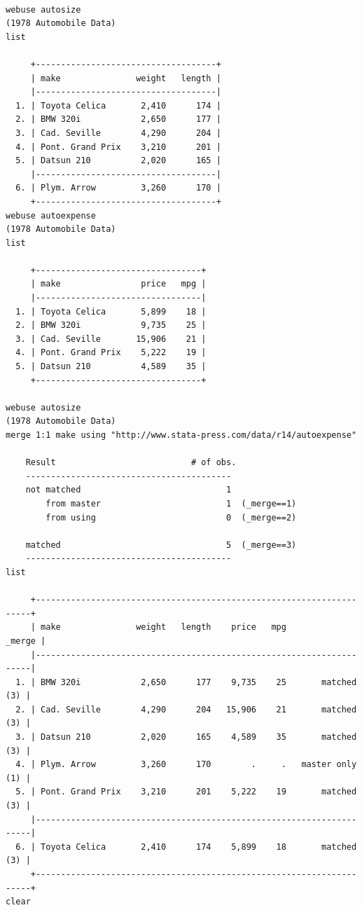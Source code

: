 \documentclass[
]{book}
\begin{document}
\begin{verbatim}

webuse autosize 
(1978 Automobile Data)
list

     +------------------------------------+
     | make               weight   length |
     |------------------------------------|
  1. | Toyota Celica       2,410      174 |
  2. | BMW 320i            2,650      177 |
  3. | Cad. Seville        4,290      204 |
  4. | Pont. Grand Prix    3,210      201 |
  5. | Datsun 210          2,020      165 |
     |------------------------------------|
  6. | Plym. Arrow         3,260      170 |
     +------------------------------------+
webuse autoexpense
(1978 Automobile Data)
list

     +---------------------------------+
     | make                price   mpg |
     |---------------------------------|
  1. | Toyota Celica       5,899    18 |
  2. | BMW 320i            9,735    25 |
  3. | Cad. Seville       15,906    21 |
  4. | Pont. Grand Prix    5,222    19 |
  5. | Datsun 210          4,589    35 |
     +---------------------------------+

webuse autosize
(1978 Automobile Data)
merge 1:1 make using "http://www.stata-press.com/data/r14/autoexpense"

    Result                           # of obs.
    -----------------------------------------
    not matched                             1
        from master                         1  (_merge==1)
        from using                          0  (_merge==2)

    matched                                 5  (_merge==3)
    -----------------------------------------
list

     +---------------------------------------------------------------------+
     | make               weight   length    price   mpg            _merge |
     |---------------------------------------------------------------------|
  1. | BMW 320i            2,650      177    9,735    25       matched (3) |
  2. | Cad. Seville        4,290      204   15,906    21       matched (3) |
  3. | Datsun 210          2,020      165    4,589    35       matched (3) |
  4. | Plym. Arrow         3,260      170        .     .   master only (1) |
  5. | Pont. Grand Prix    3,210      201    5,222    19       matched (3) |
     |---------------------------------------------------------------------|
  6. | Toyota Celica       2,410      174    5,899    18       matched (3) |
     +---------------------------------------------------------------------+
clear



\end{verbatim}
\end{document}
